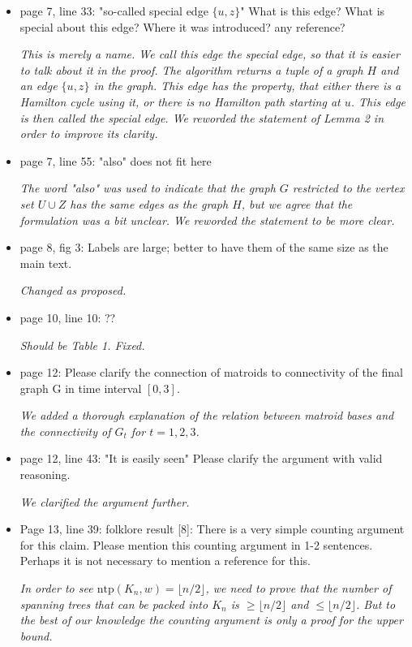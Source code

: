 \documentclass[11pt,a4paper]{article}
\begin{document}
\begin{itemize}
\item page 7, line 33: "so-called special edge $\{u, z\}$" What is this edge? What is special about this edge? Where it was introduced? any reference? 

\textit{This is merely a name. We call this edge the \emph{special edge}, so that it is easier to talk about it in the proof. The algorithm returns a tuple of a graph $H$ and an edge $\{u,z\}$ in the graph. This edge has the property, that either there is a Hamilton cycle using it, or there is no Hamilton path starting at $u$. This edge is then called the special edge. We reworded the statement of Lemma 2 in order to improve its clarity.}

\item page 7, line 55: "also" does not fit here

\textit{The word "also" was used to indicate that the graph $G$ restricted to the vertex set $U \cup Z$ has the same edges as the graph $H$, but we agree that the formulation was a bit unclear. We reworded the statement to be more clear.}

\item page 8, fig 3: Labels are large; better to have them of the same size as the main text.

\textit{Changed as proposed.}

\item page 10, line 10: ??

\textit{Should be Table 1. Fixed.}

\item page 12: Please clarify the connection of matroids to connectivity of the final graph G in time interval $[0,3]$.

\textit{We added a thorough explanation of the relation between matroid bases and the connectivity of $G_t$ for $t=1,2,3$.}

\item page 12, line 43: "It is easily seen" Please clarify the argument with valid reasoning.

\textit{We clarified the argument further.}

\item Page 13, line 39: folklore result [8]: There is a very simple counting argument for this claim. Please mention this counting argument in 1-2 sentences. Perhaps it is not necessary to mention a reference for this.

\textit{In order to see $\text{ntp}(K_n, w) = \lfloor n/2 \rfloor$, we need to prove that the number of spanning trees that can be packed into $K_n$ is $\geq \lfloor n/2 \rfloor$ and $\leq \lfloor n/2 \rfloor$. But to the best of our knowledge the counting argument is only a proof for the upper bound.}


\end{itemize}
\end{document}

